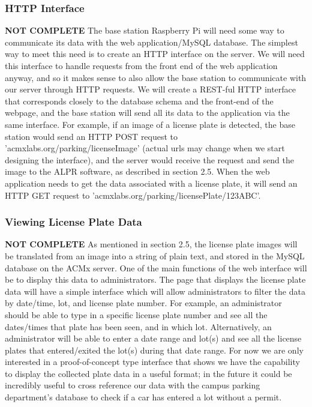 \documentclass[11pt, oneside, fullpage, doublespace]{article}
\begin{document}
\subsubsection{HTTP Interface}
{\color{red}\textbf{NOT COMPLETE}}
The base station Raspberry Pi will need some way to communicate its data with the web application/MySQL database. The simplest way to meet this need is to create an HTTP interface on the server. We will need this interface to handle requests from the front end of the web application anyway, and so it makes sense to also allow the base station to communicate with our server through HTTP requests. We will create a REST-ful HTTP interface that corresponds closely to the database schema and the front-end of the webpage, and the base station will send all its data to the application via the same interface. For example, if an image of a license plate is detected, the base station would send an HTTP POST request to 'acmxlabs.org/parking/licenseImage' (actual urls may change when we start designing the interface), and the server would receive the request and send the image to the ALPR software, as described in section 2.5. When the web application needs to get the data associated with a license plate, it will send an HTTP GET request to 'acmxlabs.org/parking/licensePlate/123ABC'.

\subsubsection{Viewing License Plate Data}
{\color{red}\textbf{NOT COMPLETE}}
As mentioned in section 2.5, the license plate images will be translated from an image into a string of plain text, and stored in the MySQL database on the ACMx server. One of the main functions of the web interface will be to display this data to administrators. The page that displays the license plate data will have a simple interface which will allow administrators to filter the data by date/time, lot, and license plate number. For example, an administrator should be able to type in a specific license plate number and see all the dates/times that plate has been seen, and in which lot. Alternatively, an administrator will be able to enter a date range and lot(s) and see all the license plates that entered/exited the lot(s) during that date range. For now we are only interested in a proof-of-concept type interface that shows we have the capability to display the collected plate data in a useful format; in the future it could be incredibly useful to cross reference our data with the campus parking department's database to check if a car has entered a lot without a permit.
\end{document}
